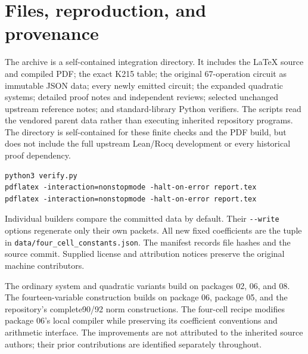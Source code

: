 \documentclass[11pt,a4paper]{article}
\theoremstyle{remark}\newtheorem{remark}[theorem]{Remark}
\newcommand{\file}[1]{\nolinkurl{#1}}
\begin{document}
\appendix
\section{Files, reproduction, and provenance}
The archive is a self-contained integration directory. It includes the
LaTeX source and compiled PDF; the exact K215 table; the original
67-operation circuit as immutable JSON data; every newly emitted circuit;
the expanded quadratic systems; detailed proof notes and independent
reviews; selected unchanged upstream reference notes; and standard-library
Python verifiers. The scripts read the vendored parent data rather than
executing inherited repository programs. The directory is self-contained
for these finite checks and the PDF build, but does not include the full
upstream Lean/Rocq development or every historical proof dependency.
\begin{lstlisting}
python3 verify.py
pdflatex -interaction=nonstopmode -halt-on-error report.tex
pdflatex -interaction=nonstopmode -halt-on-error report.tex
\end{lstlisting}
Individual builders compare the committed data by default. Their
\file{--write} options regenerate only their own packets. All new fixed
coefficients are the tuple in \file{data/four_cell_constants.json}.
The manifest records file hashes and the source commit. Supplied license
and attribution notices preserve the original machine contributors.

The ordinary system and quadratic variants build on packages 02, 06,
and 08. The fourteen-variable construction builds on package 06, package
05, and the repository's complete90/92 norm constructions. The four-cell
recipe modifies package 06's local compiler while preserving its
coefficient conventions and arithmetic interface. The improvements are
not attributed to the inherited source authors; their prior contributions
are identified separately throughout.
\end{document}
